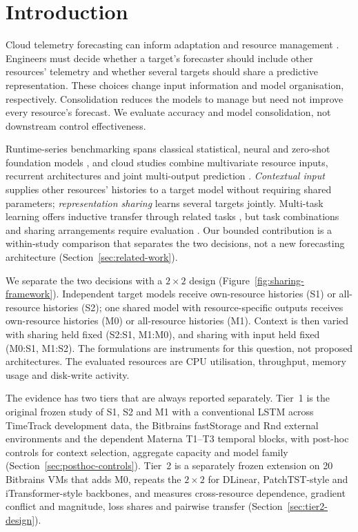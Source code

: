 \documentclass[5p,twocolumn]{elsarticle}
\begin{document}
\section{Introduction}
\label{sec:introduction}

Cloud telemetry forecasting can inform adaptation and resource management
\citep{Taherizadeh2018Monitoring,Bauer2020SelfAware}.
Engineers must decide whether a target's forecaster should include other
resources' telemetry and whether several targets should share a predictive
representation. These choices change input information and model organisation,
respectively. Consolidation reduces the models to manage but need not improve
every resource's forecast. We evaluate accuracy and model consolidation,
not downstream control effectiveness.

Runtime-series benchmarking spans classical statistical, neural and zero-shot
foundation models \citep{DiMenna2026RuntimeForecasting}, and cloud studies
combine multivariate resource inputs, recurrent architectures and joint
multi-output prediction \citep{Ullah2023CloudBiLSTM,Tripathi2025MMRP}.
\emph{Contextual input} supplies other resources' histories to a target model
without requiring shared parameters; \emph{representation sharing} learns
several targets jointly. Multi-task learning offers inductive transfer through
related tasks \citep{Caruana1997Multitask}, but task combinations and sharing
arrangements require evaluation
\citep{Standley2020TaskGrouping,Fifty2021TaskGroupings,Nochumsohn2025MTLinear}.
Our bounded contribution is a within-study comparison that separates the two
decisions, not a new forecasting architecture (Section~\ref{sec:related-work}).

We separate the two decisions with a $2\times2$ design
(Figure~\ref{fig:sharing-framework}). Independent target models receive
own-resource histories (S1) or all-resource histories (S2); one shared model
with resource-specific outputs receives own-resource histories (M0) or
all-resource histories (M1). Context is then varied with sharing held fixed
(S2:S1, M1:M0), and sharing with input held fixed (M0:S1, M1:S2). The
formulations are instruments for this question, not proposed architectures.
The evaluated resources are CPU utilisation, throughput, memory usage and
disk-write activity.

The evidence has two tiers that are always reported separately. Tier~1 is
the original frozen study of S1, S2 and M1 with a conventional LSTM across
TimeTrack development data, the Bitbrains fastStorage and Rnd external
environments and the dependent Materna T1--T3 temporal blocks, with
post-hoc controls for context selection, aggregate capacity and model family
(Section~\ref{sec:posthoc-controls}). Tier~2 is a separately frozen
extension on 20 Bitbrains VMs that adds M0, repeats the $2\times2$ for
DLinear, PatchTST-style and iTransformer-style backbones, and measures
cross-resource dependence, gradient conflict and magnitude, loss shares and
pairwise transfer (Section~\ref{sec:tier2-design}).
\end{document}
